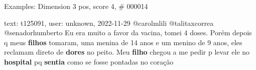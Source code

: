 \begin{frame}{Examples: Dimension 3 pos, score 4, \# 000014}
\footnotesize
\begin{exampleblock}{text: t125091, user: unknown, 2022-11-29}
@carolmlili @talitaxcorrea @senadorhumberto Eu era muito a favor da vacina, 
tomei 4 doses. Porém depois q meus \textbf{filhos} tomaram, uma menina de 14 
anos e um menino de 9 anos, eles reclamam direto de \textbf{dores} no peito. 
Meu \textbf{filho} chegou a me pedir p levar ele no \textbf{hospital} pq 
\textbf{sentia} como se fosse pontadas no coração 
\end{exampleblock}
\end{frame}
